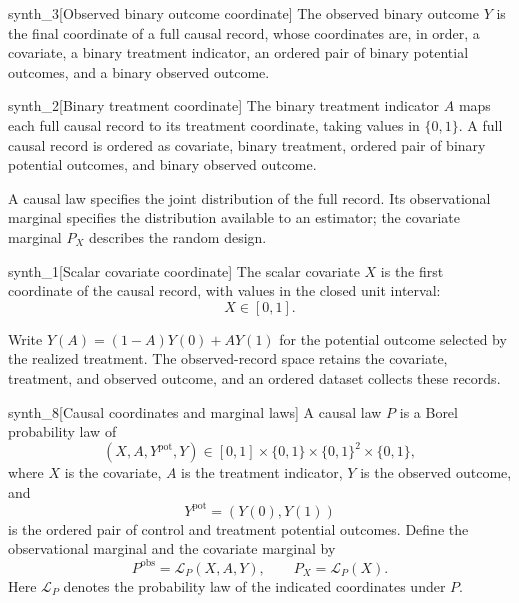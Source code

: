 \begin{definitionv}{synth_3}[Observed binary outcome coordinate]
The observed binary outcome \(Y\) is the final coordinate of a full causal record, whose coordinates are, in order, a covariate, a binary treatment indicator, an ordered pair of binary potential outcomes, and a binary observed outcome.
\end{definitionv}

\begin{definitionv}{synth_2}[Binary treatment coordinate]
The binary treatment indicator \(A\) maps each full causal record to its treatment coordinate, taking values in \(\{0,1\}\). A full causal record is ordered as covariate, binary treatment, ordered pair of binary potential outcomes, and binary observed outcome.
\end{definitionv}

A causal law  specifies the joint distribution of the full record. Its observational marginal  specifies the distribution available to an estimator; the covariate marginal \(P_X\) describes the random design.

\begin{definitionv}{synth_1}[Scalar covariate coordinate]
The scalar covariate \(X\) is the first coordinate of the causal record, with values in the closed unit interval:
\[
X \in [0,1].
\]
\end{definitionv}

Write \(Y(A)=(1-A)Y(0)+AY(1)\) for the potential outcome selected by the realized treatment. The observed-record space  retains the covariate, treatment, and observed outcome, and an ordered dataset  collects these records.

\begin{definitionv}{synth_8}[Causal coordinates and marginal laws]
A causal law \(P\) is a Borel probability law of
\[
(X,A,Y^{\mathrm{pot}},Y)
\in[0,1]\times\{0,1\}\times\{0,1\}^2\times\{0,1\},
\]
where \(X\) is the covariate, \(A\) is the treatment indicator, \(Y\) is the observed outcome, and
\[
Y^{\mathrm{pot}}=(Y(0),Y(1))
\]
is the ordered pair of control and treatment potential outcomes. Define the observational marginal and the covariate marginal by
\[
P^{\mathrm{obs}}=\mathcal L_P(X,A,Y),
\qquad
P_X=\mathcal L_P(X).
\]
Here \(\mathcal L_P\) denotes the probability law of the indicated coordinates under \(P\).
\end{definitionv}

